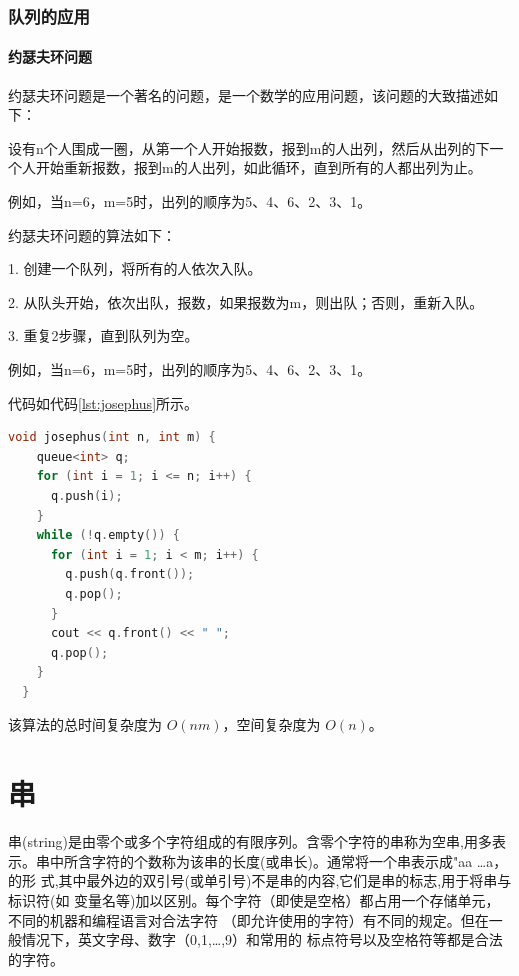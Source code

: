 \documentclass[lang=cn,newtx,10pt,scheme=chinese]{../elegantbook}
\begin{document}
\subsection{队列的应用}

\subsubsection{约瑟夫环问题}

约瑟夫环问题是一个著名的问题，是一个数学的应用问题，该问题的大致描述如下：

设有n个人围成一圈，从第一个人开始报数，报到m的人出列，然后从出列的下一个人开始重新报数，报到m的人出列，如此循环，直到所有的人都出列为止。

例如，当n=6，m=5时，出列的顺序为5、4、6、2、3、1。

约瑟夫环问题的算法如下：

1. 创建一个队列，将所有的人依次入队。

2. 从队头开始，依次出队，报数，如果报数为m，则出队；否则，重新入队。

3. 重复2步骤，直到队列为空。

例如，当n=6，m=5时，出列的顺序为5、4、6、2、3、1。

代码如代码\ref{lst:josephus}所示。

\begin{lstlisting}[language=C++, caption={约瑟夫环问题示例代码}, label={lst:josephus}]
  void josephus(int n, int m) {
    queue<int> q;
    for (int i = 1; i <= n; i++) {
      q.push(i);
    }
    while (!q.empty()) {
      for (int i = 1; i < m; i++) {
        q.push(q.front());
        q.pop();
      }
      cout << q.front() << " ";
      q.pop();
    }
  }

\end{lstlisting}

该算法的总时间复杂度为 $O(nm)$，空间复杂度为 $O(n)$。





\chapter{串}

串(string)是由零个或多个字符组成的有限序列。含零个字符的串称为空串,用多表
示。串中所含字符的个数称为该串的长度(或串长)。通常将一个串表示成"aa …a， 的形
式,其中最外边的双引号(或单引号)不是串的内容,它们是串的标志,用于将串与标识符(如
变量名等)加以区别。每个字符（即使是空格）都占用一个存储单元，不同的机器和编程语言对合法字符
（即允许使用的字符）有不同的规定。但在一般情况下，英文字母、数字（0,1,…,9）和常用的
标点符号以及空格符等都是合法的字符。
\end{document}
